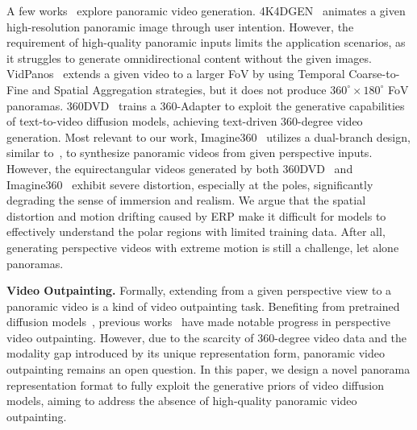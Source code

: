 A few works~\cite{wang2024360dvd, li20244k4dgen, ma2024vidpanos, tan2024imagine360} explore panoramic video generation. 
%
4K4DGEN~\cite{li20244k4dgen} animates a given high-resolution panoramic image through user intention.
%
However, the requirement of high-quality panoramic inputs limits the application scenarios, as it struggles to generate omnidirectional content without the given images.
%
VidPanos~\cite{ma2024vidpanos} extends a given video to a larger FoV by using Temporal Coarse-to-Fine and Spatial Aggregation strategies,  but it does not produce $360^\circ\times180^\circ$ FoV panoramas.
%
360DVD~\cite{wang2024360dvd} trains a 360-Adapter to exploit the generative capabilities of text-to-video diffusion models, achieving text-driven 360-degree video generation.
%
Most relevant to our work, Imagine360~\cite{tan2024imagine360} utilizes a dual-branch design, similar to~\cite{panfusion2024}, to synthesize panoramic videos from given perspective inputs. 
%
However, the equirectangular videos generated by both 360DVD~\cite{wang2024360dvd} and Imagine360~\cite{tan2024imagine360} exhibit severe distortion, especially at the poles, significantly degrading the sense of immersion and realism.
%
We argue that the spatial distortion and motion drifting caused by ERP make it difficult for models to effectively understand the polar regions with limited training data. 
%
After all, generating perspective videos with extreme motion is still a challenge, let alone panoramas.


\noindent\textbf{Video Outpainting.} Formally, extending from a given perspective view to a panoramic video is a kind of video outpainting task.
%
Benefiting from pretrained diffusion models~\cite{ho2020denoising,song2020denoising,rombach2022high,guo2023animatediff}, previous works~\cite{wang2024your,chen2024follow} have made notable progress in perspective video outpainting. 
%
However, due to the scarcity of 360-degree video data and the modality gap introduced by its unique representation form, panoramic video outpainting remains an open question.
%
In this paper, we design a novel panorama representation format to fully exploit the generative priors of video diffusion models, aiming to address the absence of high-quality panoramic video outpainting.


